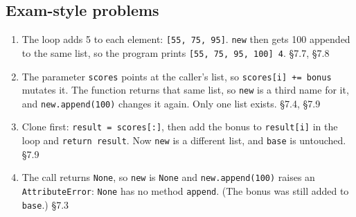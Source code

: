 \documentclass[11pt]{article}
\begin{document}
\begin{keepsection}\subsection{Exam-style problems}

\begin{enumerate}
\item The loop adds 5 to each element: \texttt{[55, 75, 95]}. \texttt{new} then gets 100 appended to the same list, so the program prints \texttt{[55, 75, 95, 100] 4}. \hfill{\small\color{FAUblue}§7.7, §7.8}
\item The parameter \texttt{scores} points at the caller’s list, so \texttt{scores[i] += bonus} mutates it. The function returns that same list, so \texttt{new} is a third name for it, and \texttt{new.append(100)} changes it again. Only one list exists. \hfill{\small\color{FAUblue}§7.4, §7.9}
\item Clone first: \texttt{result = scores[:]}, then add the bonus to \texttt{result[i]} in the loop and \texttt{return result}. Now \texttt{new} is a different list, and \texttt{base} is untouched. \hfill{\small\color{FAUblue}§7.9}
\item The call returns \texttt{None}, so \texttt{new} is \texttt{None} and \texttt{new.append(100)} raises an \texttt{AttributeError}: \texttt{None} has no method \texttt{append}. (The bonus was still added to \texttt{base}.) \hfill{\small\color{FAUblue}§7.3}
\end{enumerate}

\end{keepsection}
\end{document}
